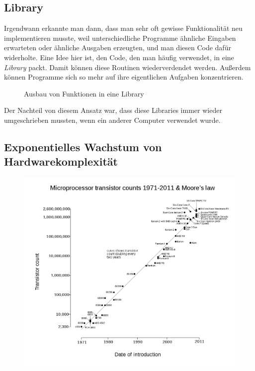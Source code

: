 \documentclass[ngerman,abstract=true]{scrartcl}
\begin{document}
\subsection{Library}

Irgendwann erkannte man dann, dass man sehr oft gewisse Funktionalität neu implementieren musste, weil unterschiedliche Programme ähnliche Eingaben erwarteten oder ähnliche Ausgaben erzeugten, und man diesen Code dafür widerholte. Eine Idee hier ist, den Code, den man häufig verwendet, in eine \emph{Library} packt. Damit können diese Routinen wiederverdendet werden. Außerdem können Programme sich so mehr auf ihre eigentlichen Aufgaben konzentrieren.

\begin{figure}[h]\centering
{}
\caption{Ausbau von Funktionen in eine Library}\label{fig:library}
\end{figure}

Der Nachteil von diesem Ansatz war, dass diese Libraries immer wieder umgeschrieben mussten, wenn ein anderer Computer verwendet wurde.

\subsection{Exponentielles Wachstum von Hardwarekomplexität}

\begin{figure}\centering
\includegraphics[width=\linewidth]{media/mooreslaw}
\end{figure}
\end{document}
